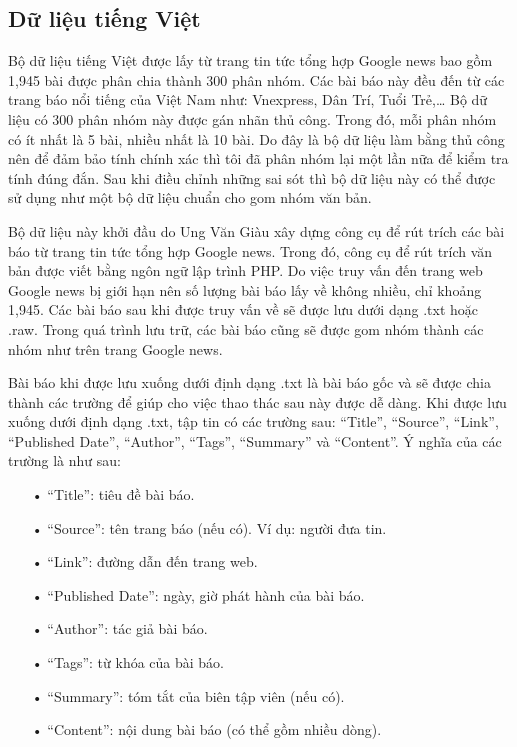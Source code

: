 \subsection{Dữ liệu tiếng Việt}
Bộ dữ liệu tiếng Việt được lấy từ trang tin tức tổng hợp Google news bao gồm 1,945 bài được phân chia thành 300 phân nhóm.
Các bài báo này đều đến từ các trang báo nổi tiếng của Việt Nam như: Vnexpress, Dân Trí, Tuổi Trẻ,\ldots
Bộ dữ liệu có 300 phân nhóm này được gán nhãn thủ công.
Trong đó, mỗi phân nhóm có ít nhất là 5 bài, nhiều nhất là 10 bài.
Do đây là bộ dữ liệu làm bằng thủ công nên để đảm bảo tính chính xác thì tôi đã phân nhóm lại một lần nữa để kiểm tra tính đúng đắn. 
Sau khi điều chỉnh những sai sót thì bộ dữ liệu này có thể được sử dụng như một bộ dữ liệu chuẩn cho gom nhóm văn bản.

Bộ dữ liệu này khởi đầu do Ung Văn Giàu xây dựng công cụ để rút trích các bài báo từ trang tin tức tổng hợp Google news.
Trong đó, công cụ để rút trích văn bản được viết bằng ngôn ngữ lập trình PHP.
Do việc truy vấn đến trang web Google news bị giới hạn nên số lượng bài báo lấy về không nhiều, chỉ khoảng 1,945.
Các bài báo sau khi được truy vấn về sẽ được lưu dưới dạng .txt hoặc .raw.
Trong quá trình lưu trữ, các bài báo cũng sẽ được gom nhóm thành các nhóm như trên trang Google news.

Bài báo khi được lưu xuống dưới định dạng .txt là bài báo gốc và sẽ được chia thành các trường để giúp cho việc thao thác sau này được dễ dàng.
Khi được lưu xuống dưới định dạng .txt, tập tin có các trường sau: ``Title'', ``Source'', ``Link'', ``Published Date'', ``Author'', ``Tags'', ``Summary'' và ``Content''.
Ý nghĩa của các trường là như sau:
\begin{enumerate}
\item[•]``Title'': tiêu đề bài báo.
\item[•]``Source'': tên trang báo (nếu có). Ví dụ: người đưa tin.
\item[•]``Link'': đường dẫn đến trang web.
\item[•]``Published Date'': ngày, giờ phát hành của bài báo.
\item[•]``Author'': tác giả bài báo.
\item[•]``Tags'': từ khóa của bài báo.
\item[•]``Summary'': tóm tắt của biên tập viên (nếu có).
\item[•]``Content'': nội dung bài báo (có thể gồm nhiều dòng).
\end{enumerate}

